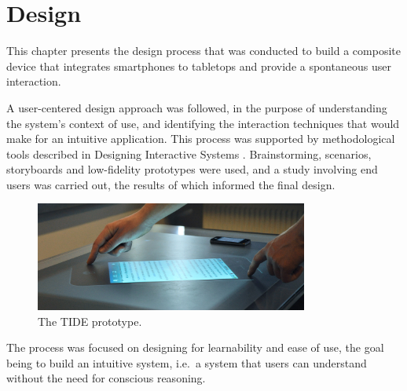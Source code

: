 
\chapter{Design}
\label{design}

This chapter presents the design process that was conducted to build a composite device that integrates smartphones to tabletops and provide a spontaneous user interaction.

A user-centered design approach was followed, in the purpose of understanding the system's context of use, and identifying the interaction techniques that would make for an intuitive application.
This process was supported by methodological tools described in Designing Interactive Systems \citep{Benyon:2010}.
Brainstorming, scenarios, storyboards and low-fidelity prototypes were used, and a study involving end users was carried out, the results of which informed the final design.

\begin{figure}[htb]
  \centering
    \includegraphics[width=0.8\textwidth]{images/tide314}
    \caption{The TIDE prototype.}
    \label{fig:tideHands}
\end{figure}

The process was focused on designing for learnability and ease of use, the goal being to build an intuitive system, i.e.\ a system that users can understand without the need for conscious reasoning.

